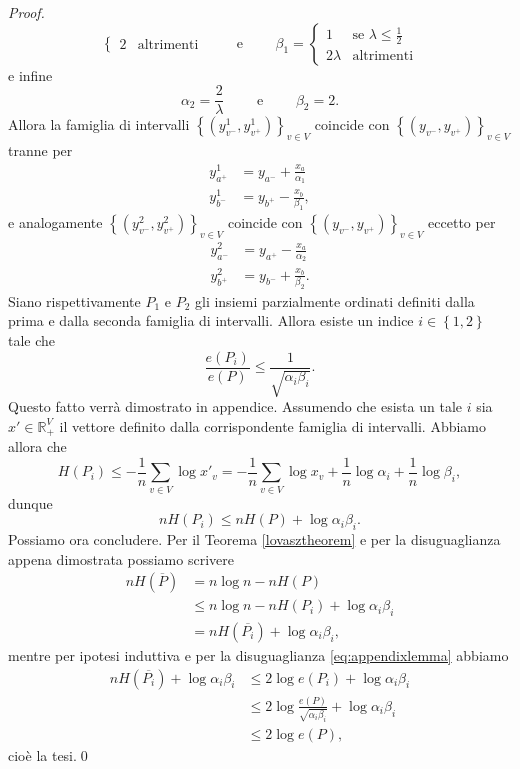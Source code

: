 \begin{proof}
\[\begin{cases}
    2 & \mbox{altrimenti} 
  \end{cases}
  \qquad\mbox{ e }\qquad \beta_1= 
  \begin{cases}
    1 & \mbox{se } \lambda\le\frac{1}{2} \\
    2\lambda & \mbox{altrimenti} 
  \end{cases}
  \]
  e infine
  \[\alpha_2=\frac{2}{\lambda}\qquad\mbox{ e }\qquad\beta_2=2.\]
  Allora la famiglia di intervalli \(\left\{\left(y_{v^-}^1, y_{v^+}^1\right)\right\}_{v\in V}\) coincide con \(\left\{\left(y_{v^-}, y_{v^+}\right)\right\}_{v\in V}\) tranne per 
  \begin{align}
    y_{a^+}^1 &= y_{a^-} + \frac{x_a}{\alpha_1} \nonumber \\
    y_{b^-}^1 &= y_{b^+} - \frac{x_b}{\beta_1}, \nonumber 
  \end{align}
  e analogamente \(\left\{\left(y_{v^-}^2, y_{v^+}^2\right)\right\}_{v\in V}\) coincide con \(\left\{\left(y_{v^-}, y_{v^+}\right)\right\}_{v\in V}\) eccetto per 
  \begin{align}
    y_{a^-}^2 &= y_{a^+} - \frac{x_a}{\alpha_2} \nonumber \\
    y_{b^+}^2 &= y_{b^-} + \frac{x_b}{\beta_2}. \nonumber 
  \end{align}
  Siano rispettivamente \(P_1\) e \(P_2\) gli insiemi parzialmente ordinati definiti dalla prima e dalla seconda famiglia di intervalli. Allora esiste un indice \(i\in\left\{1,2\right\}\) tale che 
  \begin{equation}
    \label{eq:appendixlemma} \frac{e(P_i)}{e(P)}\le\frac{1}{\sqrt{\alpha_i\beta_i}}. 
  \end{equation}
  Questo fatto verrà dimostrato in appendice. Assumendo che esista un tale \(i\) sia \(x'\in\mathbb{R}_{+}^V\) il vettore definito dalla corrispondente famiglia di intervalli. Abbiamo allora che
  \[H(P_i)\le-\frac{1}{n}\sum_{v\in V}{\log{x'_v}=-\frac{1}{n}\sum_{v\in V}{\log{x_v}}+\frac{1}{n}\log{\alpha_i}+\frac{1}{n}\log{\beta_i}},\]
  dunque
  \[nH(P_i)\le nH(P)+\log{\alpha_i\beta_i}.\]
  Possiamo ora concludere. Per il Teorema \ref{lovasztheorem} e per la disuguaglianza appena dimostrata possiamo scrivere 
  \begin{align}
    nH(\overline{P}) &= n\log{n}-nH(P) \nonumber \\
    &\le n\log{n}-nH(P_i)+\log{\alpha_i\beta_i} \nonumber \\
    &= nH(\overline{P_i})+\log{\alpha_i\beta_i}, \nonumber 
  \end{align}
  mentre per ipotesi induttiva e per la disuguaglianza \eqref{eq:appendixlemma} abbiamo 
  \begin{align}
    nH(\overline{P_i})+\log{\alpha_i\beta_i} &\le 2\log{e(P_i)}+\log{\alpha_i\beta_i} \nonumber \\
    &\le 2\log{\frac{e(P)}{\sqrt{\alpha_i\beta_i}}}+\log{\alpha_i\beta_i} \nonumber \\
    &\le 2\log{e(P)}, \nonumber 
  \end{align}
  cioè la tesi.\qed 
\end{proof}

